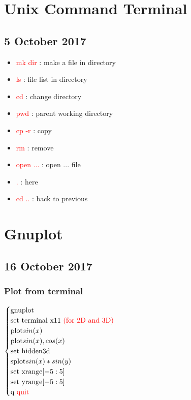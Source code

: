 \documentclass[a4paper,10pt]{article}
\begin{document}
\newpage
\section{Unix Command Terminal}

\subsection{5 October 2017}
\begin{itemize}
	\item \textcolor{red}{mk dir} : make a file in directory
	\item \textcolor{red}{ls} : file list in directory
	\item \textcolor{red}{cd} : change directory
	\item \textcolor{red}{pwd} : parent working directory
	\item \textcolor{red}{cp -r} : copy
	\item \textcolor{red}{rm} : remove
	\item \textcolor{red}{open ...} : open ... file
	\item \textcolor{red}{.} : here
	\item \textcolor{red}{cd ..} : back to previous
\end{itemize}
\newpage
\section{Gnuplot}

\subsection{16 October 2017}
\subsubsection{Plot from terminal}
$ \begin{cases}
	\text{gnuplot} \\
	\text{set terminal x11 \textcolor{red}{(for 2D and 3D)}} \\
	\text{plot} sin(x) \\
	\text{plot} sin(x), cos(x) \\
	\text{set hidden3d} \\
	\text{splot} sin(x)*sin(y) \\
	\text{set xrange}[-5:5] \\
	\text{set yrange}[-5:5] \\
	\text{q \textcolor{red}{quit}}	
\end{cases} $
\end{document}

